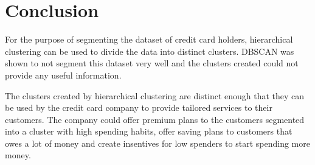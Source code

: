 \section{Conclusion}

For the purpose of segmenting the dataset of credit card holders, hierarchical clustering can be used to divide the data into distinct clusters. DBSCAN was shown to not segment this dataset very well and the clusters created could not provide any useful information.
\par
The clusters created by hierarchical clustering are distinct enough that they can be used by the credit card company to provide tailored services to their customers. The company could offer premium plans to the customers segmented into a cluster with high spending habits, offer saving plans to customers that owes a lot of money and create insentives for low spenders to start spending more money. 